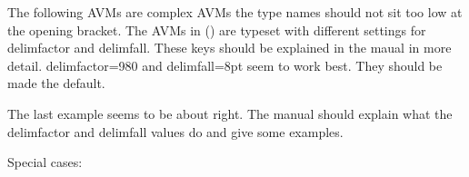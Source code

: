 \documentclass[output=book
		,modfonts
		,nonflat
	        ,collection
	        ,collectionchapter
	        ,collectiontoclongg
 	        ,biblatex  
                ,babelshorthands
                ,newtxmath
                ,colorlinks, citecolor=brown 
                ,draftmode
		  ]{langscibook}
\begin{document}
The following AVMs are complex AVMs the type names should not sit too low at the opening
bracket. The AVMs in () are typeset with different settings for delimfactor and
delimfall. These keys should be explained in the maual in more detail. delimfactor=980 and
delimfall=8pt seem to work best. They should be made the default.
\ea
{}
\z

The last example seems to be about right. The manual should explain what the delimfactor and
delimfall values do and give some examples.


Special cases:
\end{document}
